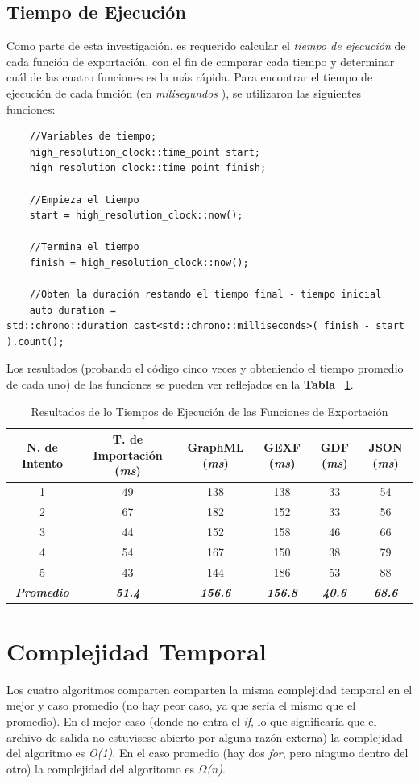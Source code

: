 \documentclass[acmlarge,screen]{acmart}
\begin{document}
\subsection{Tiempo de Ejecución}
Como parte de esta investigación, es requerido calcular el {\it tiempo de ejecución} de cada función de exportación, con el fin de comparar cada tiempo y determinar cuál de las cuatro funciones es la más rápida. Para encontrar el tiempo de ejecución de cada función (en {\it milisegundos} ), se utilizaron las siguientes funciones:
\\
\begin{verbatim}
    //Variables de tiempo;
    high_resolution_clock::time_point start;
    high_resolution_clock::time_point finish;
    
    //Empieza el tiempo
    start = high_resolution_clock::now();
    
    //Termina el tiempo
    finish = high_resolution_clock::now();
    
    //Obten la duración restando el tiempo final - tiempo inicial
    auto duration = std::chrono::duration_cast<std::chrono::milliseconds>( finish - start ).count();

\end{verbatim}

Los resultados (probando el código cinco veces y obteniendo el tiempo promedio de cada uno) de las funciones se pueden ver reflejados en la {\bf Tabla} ~\ref{tab:tiempos}.

\begin{table}
 \caption{Resultados de lo Tiempos de Ejecución de las Funciones de Exportación}
 \label{tab:tiempos}
 \begin{tabular}{c|c|c|c|c|c}
  \toprule
  N. de Intento & T. de Importación ({\it ms})& GraphML ({\it ms})& GEXF ({\it ms})& GDF ({\it ms})& JSON ({\it ms})\\
  \midrule
  1 &49 & 138 & 138 & 33 & 54\\
  2	&67	&182	&152	&33	&56\\
  3	&44	&152	&158	&46	&66\\
  4	&54	&167	&150	&38	&79\\
  5	&43	&144	&186	&53	&88\\
  \bottomrule
  {\bf \it Promedio} & {\bf \it 51.4} & {\bf \it 156.6} & {\bf \it 156.8} & {\bf \it 40.6} & {\bf \it 68.6}
 \end{tabular}
\end{table}

\section{Complejidad Temporal}
Los cuatro algoritmos comparten comparten la misma complejidad temporal en el mejor y caso promedio (no hay peor caso, ya que sería el mismo que el promedio). En el mejor caso (donde no entra el {\it if}, lo que significaría que el archivo de salida no estuvisese abierto por alguna razón externa) la complejidad del algoritmo es {\it O(1)}. En el caso promedio (hay dos {\it for}, pero ninguno dentro del otro) la complejidad del algoritomo es {\it $\Omega$(n)}.
\end{document}
